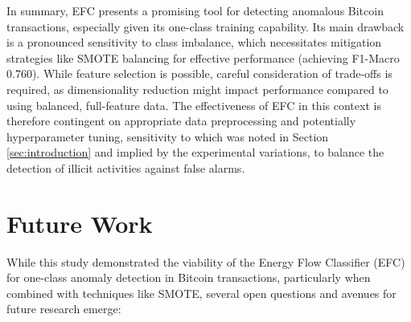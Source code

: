 \documentclass[12pt]{article}
\begin{document}
In summary, EFC presents a promising tool for detecting anomalous Bitcoin transactions, especially given its one-class
training capability. Its main drawback is a pronounced sensitivity to class imbalance, which necessitates mitigation strategies
like SMOTE balancing for effective performance (achieving F1-Macro 0.760). While feature selection is possible, careful
consideration of trade-offs is required, as dimensionality reduction might impact performance compared to using balanced,
full-feature data. The effectiveness of EFC in this context is therefore contingent on appropriate data preprocessing and
potentially hyperparameter tuning, sensitivity to which was noted in Section \ref{sec:introduction} and implied by the
experimental variations, to balance the detection of illicit activities against false alarms.


\section{Future Work} \label{sec:future_work}

While this study demonstrated the viability of the Energy Flow Classifier (EFC) for one-class anomaly detection in Bitcoin
transactions, particularly when combined with techniques like SMOTE, several open questions and avenues for future research emerge:
\end{document}
